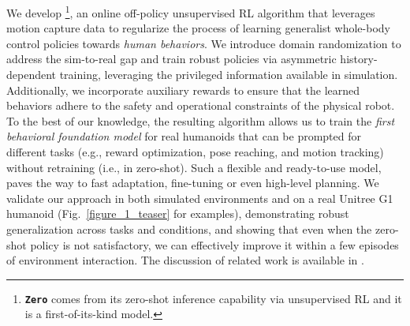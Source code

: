 We develop \method\footnote{\texttt{\textcolor{myred}{\textbf{Zero}}} comes from its zero-shot inference capability via unsupervised RL and it is a first-of-its-kind model.}, an online off-policy unsupervised RL algorithm that leverages motion capture data to regularize the process of learning generalist whole-body control policies towards \emph{human behaviors}. 
We introduce domain randomization to address the sim-to-real gap and train robust policies via asymmetric history-dependent training, leveraging the privileged information available in simulation. Additionally, we incorporate auxiliary rewards to ensure that the learned behaviors adhere to the safety and operational constraints of the physical robot. To the best of our knowledge, the resulting algorithm allows us to train the \emph{first behavioral foundation model} for real humanoids that can be prompted for different tasks (e.g., reward optimization, pose reaching, and motion tracking) without retraining (i.e., in zero-shot). Such a flexible and ready-to-use model, paves the way to fast adaptation, fine-tuning or even high-level planning.
%
We validate our approach in both simulated environments and on a real Unitree G1 humanoid (Fig.~\ref{figure_1_teaser} for examples), demonstrating robust generalization across tasks and conditions, and showing that even when the zero-shot policy is not satisfactory, we can effectively improve it within a few episodes of environment interaction. The discussion of related work is available in .


